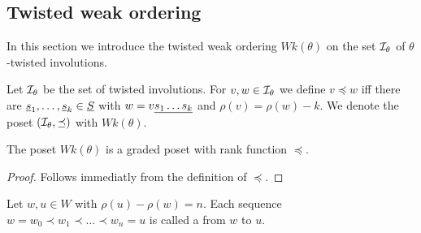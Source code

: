 \subsection{Twisted weak ordering}
\label{sec:twisted-involutions-twisted-weak-ordering}

In this section we introduce the twisted weak ordering $Wk(\theta)$ on the set $\mathcal{I}_{\theta}$ of $\theta$-twisted involutions.

\begin{defi}
	Let $\mathcal{I}_{\theta}$ be the set of twisted involutions. For $v,w \in \mathcal{I}_{\theta}$ we define $v \preceq w$ iff there are $\underline{s}_1, \ldots, \underline{s}_k \in \underline{S}$ with $w = v \underline{ s_1 \ldots s_k }$ and $\rho(v) = \rho(w) - k$. We denote the poset $(\mathcal{I}_{\theta},\preceq)$ with $Wk(\theta)$.
\end{defi}

\begin{lemm}
	The poset $Wk(\theta)$ is a graded poset with rank function $\preceq$.

	\begin{proof}
		Follows immediatly from the definition of $\preceq$.
	\end{proof}
\end{lemm}

\begin{defi}
	Let $w,u \in W$ with $\rho(u) - \rho(w) = n$. Each sequence $w = w_0 \prec w_1 \prec \ldots \prec w_n = u$ is called a  from $w$ to $u$.
\end{defi}

\todo